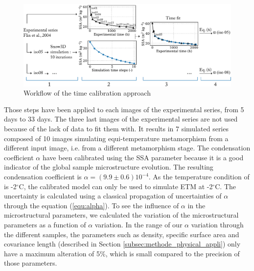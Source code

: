\documentclass[draft,ms]{agujournal2019}
\begin{document}
\hspace*{-0.2cm}
\begin{figure}
    \centering
    \includegraphics[width = \linewidth]{workflow_aff.pdf}
    \caption{Workflow of the time calibration approach}
    \label{fig:workflow}
\end{figure}
Those steps have been applied to each images of the experimental series, from 5 days to 33 days. The three last images of the experimental series are not used because of the lack of data to fit them with. It results in 7 simulated series composed of 10 images simulating equi-temperature metamorphism from a different input image, i.e. from a different metamorphism stage. The condensation coefficient $\alpha$ have been calibrated using the SSA parameter because it is a good indicator of the global sample microstructure evolution. The resulting condensation coefficient is $\alpha = ( 9.9 \pm 0.6) 10^{-4}$. As the temperature condition of  is -2$^\circ$C, the calibrated model can only be used to simulate ETM at -2$^\circ$C. The uncertainty is calculated using a classical propagation of uncertainties of $\alpha$ through the equation (\ref{equ:alpha}). To see the influence of $\alpha$ in the microstructural parameters, we calculated the variation of the microstructural parameters as a function of $\alpha$ variation. In the range of our $\alpha$ variation through the different samples, the parameters such as density, specific surface area and covariance length (described in Section \ref{subsec:methode_physical_appli}) only have a maximum alteration of 5\%, which is small compared to the precision of those parameters. 
\end{document}
